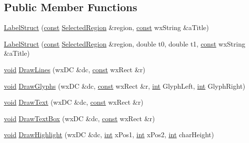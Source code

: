 \subsection*{Public Member Functions}
\begin{DoxyCompactItemize}
\item 
\hyperlink{class_label_struct_a7a157224c1e8d98552e7d37bbd4c4175}{Label\+Struct} (\hyperlink{getopt1_8c_a2c212835823e3c54a8ab6d95c652660e}{const} \hyperlink{class_selected_region}{Selected\+Region} \&region, \hyperlink{getopt1_8c_a2c212835823e3c54a8ab6d95c652660e}{const} wx\+String \&a\+Title)
\item 
\hyperlink{class_label_struct_a7b97a8462c84909e95cb7bbdbeae6e3a}{Label\+Struct} (\hyperlink{getopt1_8c_a2c212835823e3c54a8ab6d95c652660e}{const} \hyperlink{class_selected_region}{Selected\+Region} \&region, double t0, double t1, \hyperlink{getopt1_8c_a2c212835823e3c54a8ab6d95c652660e}{const} wx\+String \&a\+Title)
\item 
\hyperlink{sound_8c_ae35f5844602719cf66324f4de2a658b3}{void} \hyperlink{class_label_struct_a7fe75447943ca79178124d67f82b38c1}{Draw\+Lines} (wx\+DC \&dc, \hyperlink{getopt1_8c_a2c212835823e3c54a8ab6d95c652660e}{const} wx\+Rect \&r)
\item 
\hyperlink{sound_8c_ae35f5844602719cf66324f4de2a658b3}{void} \hyperlink{class_label_struct_a24022614875489c38f110f503926abaa}{Draw\+Glyphs} (wx\+DC \&dc, \hyperlink{getopt1_8c_a2c212835823e3c54a8ab6d95c652660e}{const} wx\+Rect \&r, \hyperlink{xmltok_8h_a5a0d4a5641ce434f1d23533f2b2e6653}{int} Glyph\+Left, \hyperlink{xmltok_8h_a5a0d4a5641ce434f1d23533f2b2e6653}{int} Glyph\+Right)
\item 
\hyperlink{sound_8c_ae35f5844602719cf66324f4de2a658b3}{void} \hyperlink{class_label_struct_a8a3c06204a11f507939dc633a4ac0761}{Draw\+Text} (wx\+DC \&dc, \hyperlink{getopt1_8c_a2c212835823e3c54a8ab6d95c652660e}{const} wx\+Rect \&r)
\item 
\hyperlink{sound_8c_ae35f5844602719cf66324f4de2a658b3}{void} \hyperlink{class_label_struct_a489fb7bc0fccd5526041835a5b6bb38b}{Draw\+Text\+Box} (wx\+DC \&dc, \hyperlink{getopt1_8c_a2c212835823e3c54a8ab6d95c652660e}{const} wx\+Rect \&r)
\item 
\hyperlink{sound_8c_ae35f5844602719cf66324f4de2a658b3}{void} \hyperlink{class_label_struct_a8aca124e1c205478aac86e1ac298ff11}{Draw\+Highlight} (wx\+DC \&dc, \hyperlink{xmltok_8h_a5a0d4a5641ce434f1d23533f2b2e6653}{int} x\+Pos1, \hyperlink{xmltok_8h_a5a0d4a5641ce434f1d23533f2b2e6653}{int} x\+Pos2, \hyperlink{xmltok_8h_a5a0d4a5641ce434f1d23533f2b2e6653}{int} char\+Height)

\end{DoxyCompactItemize}
